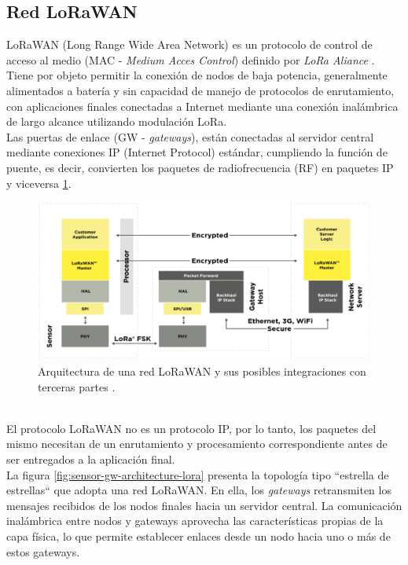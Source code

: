 \subsection{Red LoRaWAN}
LoRaWAN (Long Range Wide Area Network) es un protocolo de control de acceso al medio (MAC - \textit{Medium Acces Control}) definido por \textit{LoRa Aliance} \citep{lora_alliance}. Tiene por objeto permitir la conexión de nodos de baja potencia, generalmente alimentados a batería y sin capacidad de manejo de protocolos de enrutamiento, con aplicaciones finales conectadas a Internet mediante una conexión inalámbrica de largo alcance utilizando modulación LoRa.\\
Las puertas de enlace (GW - \textit{gateways}), están conectadas al servidor central mediante conexiones IP (Internet Protocol) estándar, cumpliendo la función de puente, es decir, convierten los paquetes de radiofrecuencia (RF) en paquetes IP y viceversa \ref{fig:arqlorawan}.\\
\begin{figure}[h]
	\centering
	\includegraphics[width=1.05\linewidth]{Figures/arq_lorawan_2}
	\caption{Arquitectura de una red LoRaWAN y sus posibles integraciones con terceras partes \citep{lora_alliance}.}
	\label{fig:arqlorawan}
\end{figure}\\
El protocolo LoRaWAN no es un protocolo IP, por lo tanto, los paquetes del mismo necesitan de un enrutamiento y procesamiento correspondiente antes de ser entregados a la aplicación final.\\
La figura \ref{fig:sensor-gw-architecture-lora} presenta la topología tipo ``estrella de estrellas`` que adopta una red LoRaWAN. En ella, los \textit{gateways} retransmiten los mensajes recibidos de los nodos finales hacia un servidor central. La comunicación inalámbrica entre nodos y gateways aprovecha las características propias de la capa física, lo que permite establecer enlaces desde un nodo hacia uno o más de estos gateways.\\
